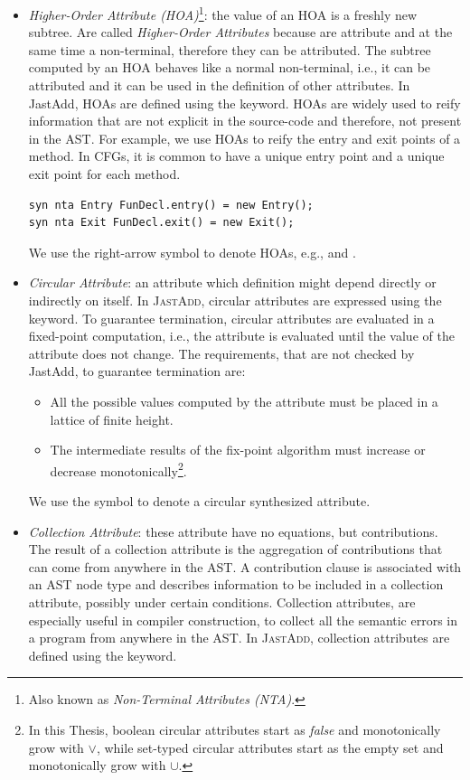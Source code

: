\begin{itemize}
    \item \emph{Higher-Order Attribute (HOA)}\footnote{Also known as \emph{Non-Terminal Attributes (NTA)}.}:
    the value of an HOA is a freshly new subtree. Are called \emph{Higher-Order Attributes}
    because are attribute and at the same time a non-terminal, therefore they can be attributed.
    The subtree computed by an HOA behaves like a normal non-terminal, i.e., it can be
    attributed and it can be used in the definition of other attributes. In JastAdd, HOAs
    are defined using the  keyword. HOAs are widely used to reify information
    that are not explicit in the source-code and therefore, not present in the AST.
    For example, we use HOAs to reify the entry and exit points of a method. In CFGs, it
    is common to have a unique entry point and a unique exit point for each method.
    \begin{lstlisting}[language=JastAdd]
syn nta Entry FunDecl.entry() = new Entry();
syn nta Exit FunDecl.exit() = new Exit();
    \end{lstlisting}
    We use the right-arrow symbol to denote HOAs, e.g.,   and .
    \item \emph{Circular Attribute}: an attribute which definition might depend directly
    or indirectly on itself. In \textsc{JastAdd}, circular attributes are expressed using the 
    keyword. To guarantee termination, circular attributes are evaluated in a fixed-point
    computation, i.e., the attribute is evaluated until the value of the attribute does not change.
    The requirements, that are not checked by JastAdd, to guarantee termination are:
    \begin{itemize}
        \item All the possible values computed by the attribute must be placed
        in a lattice of finite height.
        \item The intermediate results of the fix-point algorithm must increase
        or decrease monotonically\footnote{In this Thesis, boolean circular attributes start
        as \emph{false} and monotonically grow with $\vee$, while set-typed circular attributes
        start as the empty set and monotonically grow with $\cup$.}.
    \end{itemize}
    We use the symbol  to denote a circular synthesized attribute.

    \item \emph{Collection Attribute}: these attribute have no equations, but contributions. The
    result of a collection attribute is the aggregation of contributions that can
    come from anywhere in the AST. A contribution clause is associated with
    an AST node type and describes information to be included in a collection
    attribute, possibly under certain conditions. Collection attributes, are especially
    useful in compiler construction, to collect all the semantic errors in a program
    from anywhere in the AST. In \textsc{JastAdd}, collection attributes are defined using the
     keyword.


\end{itemize}
